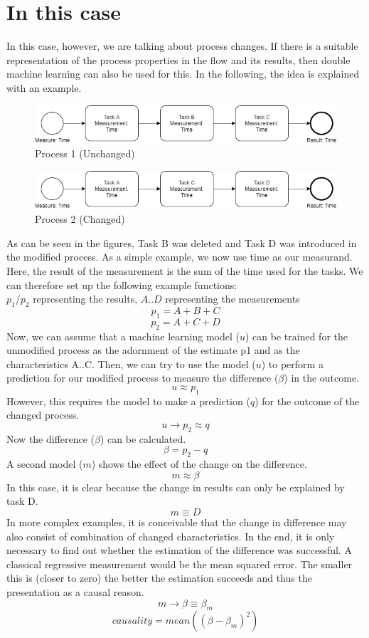     \section{In this case}
    In this case, however, we are talking about process changes. If there is a suitable representation of the process properties in the flow and its results, then double machine learning can also be used for this. In the following, the idea is explained with an example.
    \begin{figure}[H]
        \centering
        \includegraphics[width=0.99\textwidth-2\fboxsep-2\fboxrule]{includes/p1.png}
        \caption{Process 1 (Unchanged)}
        \label{p1}
    \end{figure}
    \begin{figure}[H]
        \centering
        \includegraphics[width=0.99\textwidth-2\fboxsep-2\fboxrule]{includes/p2.png}
        \caption{Process 2 (Changed)}
        \label{p2}
    \end{figure}
    As can be seen in the figures, Task B was deleted and Task D was introduced in the modified process. As a simple example, we now use time as our measurand. Here, the result of the measurement is the sum of the time used for the tasks. We can therefore set up the following example functions:\\
    \small{$p_1$/$p_2$ representing the results, $A$..$D$ representing the measurements}
    \[p_1 = A + B + C\]
    \[p_2 = A + C + D\]
    Now, we can assume that a machine learning model ($u$) can be trained for the unmodified process as the adornment of the estimate p1 and as the characteristics A..C. Then, we can try to use the model ($u$) to perform a prediction for our modified process to measure the difference ($\beta$) in the outcome.
    \[u \approx p_1\]
    However, this requires the model to make a prediction ($q$) for the outcome of the changed process.
    \[u \rightarrow p_2 \approx q\]
    Now the difference ($\beta$) can be calculated.
    \[\beta = p_2 - q\]
    A second model ($m$) shows the effect of the change on the difference.
    \[m \approx \beta\]
    In this case, it is clear because the change in results can only be explained by task D.
    \[m \equiv D\]
    In more complex examples, it is conceivable that the change in difference may also consist of combination of changed characteristics. In the end, it is only necessary to find out whether the estimation of the difference was successful. A classical regressive measurement would be the mean squared error. The smaller this is (closer to zero) the better the estimation succeeds and thus the presentation as a causal reason.
    \[m \rightarrow \beta \equiv \beta_m\]
    \[causality = mean((\beta-\beta_m)^2)\]
\clearpage
